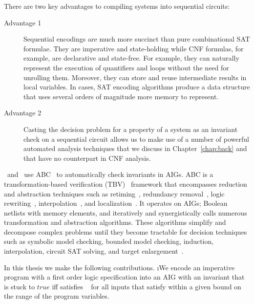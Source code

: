 There are two key advantages to compiling systems 
into sequential circuits:
\begin{description}
\item[Advantage 1] Sequential encodings are much more 
succinct than pure combinational SAT formulae.
They are imperative and state-holding while CNF formulas, for example, are 
declarative and state-free.  
For example, they can naturally represent 
the execution of quantifiers and loops without 
the need for unrolling them.
Moreover, they can store and reuse 
intermediate results in local variables.
In cases, SAT encoding algorithms produce a
data structure that uses several orders of magnitude more 
memory to represent.

\item[Advantage 2]  Casting the decision problem for a 
property of a system as an invariant check on a sequential 
circuit allows us to make use of a number of powerful 
automated analysis techniques that we discuss in 
Chapter~\ref{chap:back}
and that have no counterpart in CNF analysis. 
\end{description}


\mytool~and \biptool~use ABC~\cite{brayton2010abc} to automatically check
invariants in AIGs. ABC is
a transformation-based 
verification (TBV)~\cite{kuehlmann2001transformation} framework that 
encompasses reduction and abstraction techniques such as 
retiming~\cite{KuBa01}, redundancy 
removal~\cite{HmBPK05,KuMP01,BjesseC00,aziz-fmsd-00}, logic
rewriting~\cite{BjBo04}, interpolation~\cite{McMillan03}, 
and localization~\cite{Wang03}.
It operates on AIGs; Boolean netlists with
memory elements, and iteratively and synergistically 
calls numerous transformation and abstraction algorithms. 
These algorithms simplify and decompose complex problems 
until they become tractable for decision techniques such 
as symbolic model checking,
bounded model checking, induction, interpolation, 
circuit SAT solving, and target
enlargement~\cite{MoGS00,MoMZ01,HoSH00,BaKuAb02,Hari05expert}.

In this thesis we make the following contributions. 
\be
\i We encode an imperative program \Pm with a first order logic 
specification \pair{\Pre}{\Post} into an AIG with an invariant
that is stuck to $\mathit{true}$ iff  \Pm satisfies \Post~ for all inputs that
satisfy \Pre within a given bound on the range of the program variables. 

